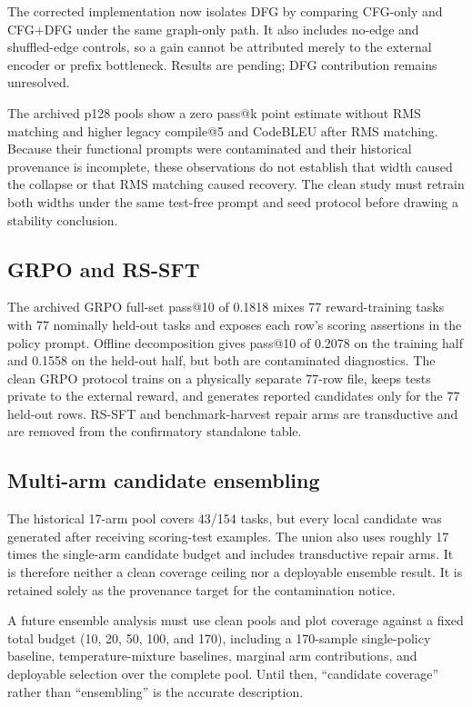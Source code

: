 \documentclass[11pt]{article}
\begin{document}
The corrected implementation now isolates DFG by comparing CFG-only and CFG+DFG under the same graph-only path. It also includes no-edge and shuffled-edge controls, so a gain cannot be attributed merely to the external encoder or prefix bottleneck. Results are pending; DFG contribution remains unresolved.

The archived p128 pools show a zero pass@k point estimate without RMS matching and higher legacy compile@5 and CodeBLEU after RMS matching. Because their functional prompts were contaminated and their historical provenance is incomplete, these observations do not establish that width caused the collapse or that RMS matching caused recovery. The clean study must retrain both widths under the same test-free prompt and seed protocol before drawing a stability conclusion.

\subsection{GRPO and RS-SFT}

The archived GRPO full-set pass@10 of 0.1818 mixes 77 reward-training tasks with 77 nominally held-out tasks and exposes each row's scoring assertions in the policy prompt. Offline decomposition gives pass@10 of 0.2078 on the training half and 0.1558 on the held-out half, but both are contaminated diagnostics. The clean GRPO protocol trains on a physically separate 77-row file, keeps tests private to the external reward, and generates reported candidates only for the 77 held-out rows. RS-SFT and benchmark-harvest repair arms are transductive and are removed from the confirmatory standalone table.

\subsection{Multi-arm candidate ensembling}
\label{sec:ensemble}

The historical 17-arm pool covers 43/154 tasks, but every local candidate was generated after receiving scoring-test examples. The union also uses roughly 17 times the single-arm candidate budget and includes transductive repair arms. It is therefore neither a clean coverage ceiling nor a deployable ensemble result. It is retained solely as the provenance target for the contamination notice.

A future ensemble analysis must use clean pools and plot coverage against a fixed total budget (10, 20, 50, 100, and 170), including a 170-sample single-policy baseline, temperature-mixture baselines, marginal arm contributions, and deployable selection over the complete pool. Until then, ``candidate coverage'' rather than ``ensembling'' is the accurate description.
\end{document}
